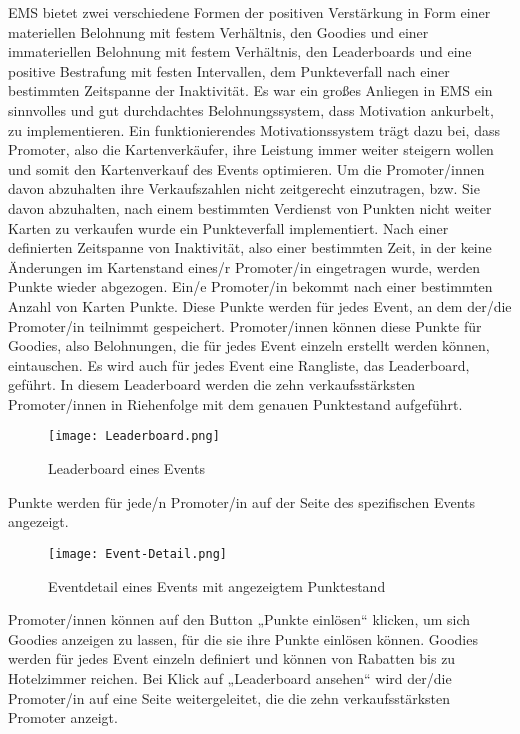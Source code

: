 		EMS bietet zwei verschiedene Formen der positiven Verstärkung in Form einer materiellen Belohnung mit festem Verhältnis, den Goodies und einer immateriellen Belohnung mit festem Verhältnis, den Leaderboards und eine positive Bestrafung mit festen Intervallen, dem Punkteverfall nach einer bestimmten Zeitspanne der Inaktivität.
Es war ein großes Anliegen in EMS ein sinnvolles und gut durchdachtes Belohnungssystem, dass Motivation ankurbelt, zu implementieren.
Ein funktionierendes Motivationssystem trägt dazu bei, dass Promoter, also die Kartenverkäufer, ihre Leistung immer weiter steigern wollen und somit den Kartenverkauf des Events optimieren. 
Um die Promoter/innen davon abzuhalten ihre Verkaufszahlen nicht zeitgerecht einzutragen, bzw. Sie davon abzuhalten, nach einem bestimmten Verdienst von Punkten nicht weiter Karten zu verkaufen wurde ein Punkteverfall implementiert. Nach einer definierten Zeitspanne von Inaktivität, also einer bestimmten Zeit, in der keine Änderungen im Kartenstand eines/r Promoter/in eingetragen wurde, werden Punkte wieder abgezogen.
Ein/e Promoter/in bekommt nach einer bestimmten Anzahl von Karten Punkte. Diese Punkte werden für jedes Event, an dem der/die Promoter/in teilnimmt gespeichert. 
Promoter/innen können diese Punkte für Goodies, also Belohnungen, die für jedes Event einzeln erstellt werden können, eintauschen. 
Es wird auch für jedes Event eine Rangliste, das Leaderboard, geführt. In diesem Leaderboard werden die zehn verkaufsstärksten Promoter/innen in Riehenfolge mit dem genauen Punktestand aufgeführt. 

	\begin{center}
		\begin{figure}[h]
    \centering
    \texttt{[image: Leaderboard.png]}
    \caption{Leaderboard eines Events}
		\end{figure}
		\end{center}

Punkte werden für jede/n Promoter/in auf der Seite des spezifischen Events angezeigt. 

	\begin{center}
		\begin{figure}[h]
    \centering
    \texttt{[image: Event-Detail.png]}
    \caption{Eventdetail eines Events mit angezeigtem Punktestand}
		\end{figure}
		\end{center}
Promoter/innen können auf den Button „Punkte einlösen“ klicken, um sich Goodies anzeigen zu lassen, für die sie ihre Punkte einlösen können. Goodies werden für jedes Event einzeln definiert und können von Rabatten bis zu Hotelzimmer reichen.
Bei Klick auf „Leaderboard ansehen“ wird der/die Promoter/in auf eine Seite weitergeleitet, die die zehn verkaufsstärksten Promoter anzeigt. 



